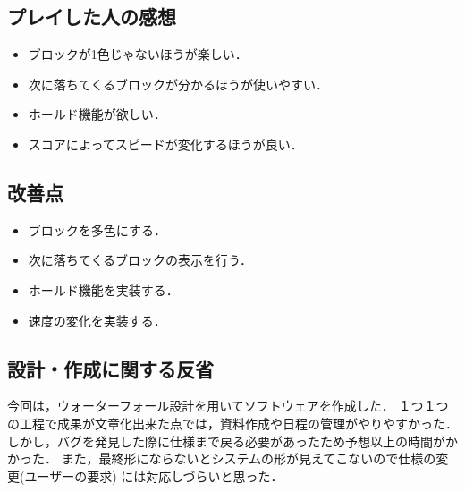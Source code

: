 \subsection{プレイした人の感想}
\begin{itemize}
  \item ブロックが1色じゃないほうが楽しい．
  \item 次に落ちてくるブロックが分かるほうが使いやすい．
  \item ホールド機能が欲しい．
  \item スコアによってスピードが変化するほうが良い．
\end{itemize}

\subsection{改善点}
\begin{itemize}
  \item ブロックを多色にする．
  \item 次に落ちてくるブロックの表示を行う．
  \item ホールド機能を実装する．
  \item 速度の変化を実装する．
\end{itemize}

\subsection{設計・作成に関する反省}
今回は，ウォーターフォール設計を用いてソフトウェアを作成した．
１つ１つの工程で成果が文章化出来た点では，資料作成や日程の管理がやりやすかった．
しかし，バグを発見した際に仕様まで戻る必要があったため予想以上の時間がかかった．
また，最終形にならないとシステムの形が見えてこないので仕様の変更(ユーザーの要求)
には対応しづらいと思った．
